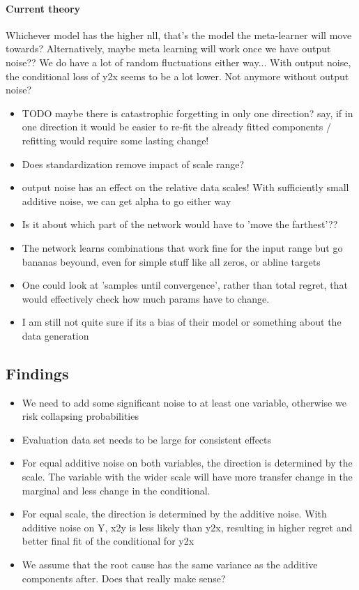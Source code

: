 \documentclass{article}
\begin{document}
\paragraph{Current theory}
Whichever model has the higher nll, that's the model the meta-learner will move towards?
Alternatively, maybe meta learning will work once we have output noise??
We do have a lot of random fluctuations either way...
With output noise, the conditional loss of y2x seems to be a lot lower. Not anymore without output noise?
\begin{itemize}
    \item TODO maybe there is catastrophic forgetting in only one direction? say, if in one direction it would be easier to re-fit the already fitted components / refitting would require some lasting change!
    \item Does standardization remove impact of scale range?
    \item output noise has an effect on the relative data scales! With sufficiently small additive noise, we can get alpha to go either way
    \item Is it about which part of the network would have to 'move the farthest'??
    \item The network learns combinations that work fine for the input range but go bananas beyound, even for simple stuff like all zeros, or abline targets
    \item One could look at 'samples until convergence', rather than total regret, that would effectively check how much params have to change.
    \item I am still not quite sure if its a bias of their model or something about the data generation
\end{itemize}

\clearpage
\subsection{Findings}
\begin{itemize}
    \item We need to add some significant noise to at least one variable, otherwise we risk collapsing probabilities
    \item Evaluation data set needs to be large for consistent effects
    \item For equal additive noise on both variables, the direction is determined by the scale. The variable with the wider scale will have more transfer change in the marginal and less change in the conditional.
    \item For equal scale, the direction is determined by the additive noise. With additive noise on Y, x2y is less likely than y2x, resulting in higher regret and better final fit of the conditional for y2x
    \item We assume that the root cause has the same variance as the additive components after. Does that really make sense?
\end{itemize}
\end{document}
